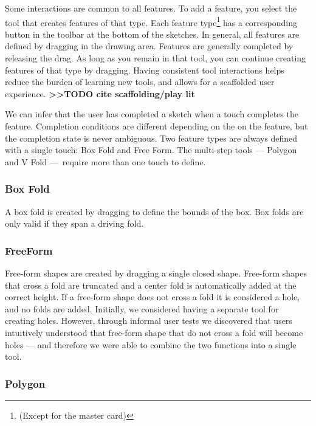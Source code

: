 Some interactions are common to all features. To add a feature, you
select the tool that creates features of that type. Each feature
type\footnote{(Except for the master card)} has a corresponding button
in the toolbar at the bottom of the sketches. In general, all features
are defined by dragging in the drawing area. Features are generally
completed by releasing the drag. As long as you remain in that tool, you
can continue creating features of that type by dragging. Having
consistent tool interactions helps reduce the burden of learning new
tools, and allows for a scaffolded user experience.
\textbf{\textgreater{}\textgreater{}TODO cite scaffolding/play lit}

We can infer that the user has completed a sketch when a touch completes
the feature. Completion conditions are different depending on the on the
feature, but the completion state is never ambiguous. Two feature types
are always defined with a single touch: Box Fold and Free Form. The
multi-step tools --- Polygon and V Fold ---~require more than one touch
to define.

\subsubsection{Box Fold}\label{box-fold}

A box fold is created by dragging to define the bounds of the box. Box
folds are only valid if they span a driving fold.

\subsubsection{FreeForm}\label{freeform}

Free-form shapes are created by dragging a single closed shape.
Free-form shapes that cross a fold are truncated and a center fold is
automatically added at the correct height. If a free-form shape does not
cross a fold it is considered a hole, and no folds are added. Initially,
we considered having a separate tool for creating holes. However,
through informal user tests we discovered that users intuitively
understood that free-form shape that do not cross a fold will become
holes --- and therefore we were able to combine the two functions into a
single tool.

\subsubsection{Polygon}\label{polygon}

